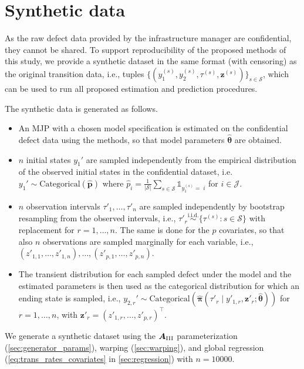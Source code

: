 \begin{table}[h!]  
\centering
\caption{L1-norm of transition residuals $
|| \bm R || $ and normalized predictive entropy $H$ for different model settings.} \label{tab:transition_structure_L1}
\centering
\scriptsize
   
\end{table} 



\newpage

\section{Synthetic data} \label{sec:synthetic_data}
As the raw defect data provided by the infrastructure manager are confidential, they cannot be shared. To support reproducibility of the proposed methods of this study, we provide a synthetic dataset in the same format (with censoring) as the original transition data, i.e., tuples $\{(y_1^{(s)},y_2^{(s)},\tau^{(s)},\bm z^{(s)})\}_{s \in \mathcal S}$, which can be used to run all proposed estimation and prediction procedures.

The synthetic data is generated as follows.
\begin{itemize}
\item An MJP with a chosen model specification is estimated on the confidential defect data using the methods, so that model parameters $\widehat{\bm \theta}$ are obtained.
\item $n$ initial states $y_1'$ are sampled independently from the empirical distribution of the observed initial states in the confidential dataset, i.e.
$
y_1' \sim \text{Categorical}(\widehat{\bm p})$ where $\widehat p_i = \frac{1}{| \mathcal S|} \sum_{s\in\mathcal S} \mathds{1}_{y_1^{(s)}=\;i}
$ for $i \in \mathcal J$. 
\item $n$ observation intervals $\tau'_1,\dots,\tau'_n$ are sampled independently by bootstrap resampling from the observed intervals, i.e.,
$
\tau'_r \overset{\text{i.i.d.}}{\sim} \{\tau^{(s)}: s\in\mathcal S\} $ with replacement for $ r=1,\dots,n$. The same is done for the $p$ covariates, so that also $n$ observations are sampled marginally for each variable, i.e., $(z'_{1,1},\dots,z'_{1,n} ), \dots, (z'_{p,1},\dots,z'_{p,n})$. 
\item The transient distribution for each sampled defect under the model and the estimated parameters is then used as the categorical distribution for which an ending state is sampled, i.e., 
$
y_{2,r}' \sim \text{Categorical}(\widehat{\bm\pi}( \tau'_r \mid y'_{1,r}, \bm z'_r; \widehat{\bm\theta}) )
$ for $r = 1, \dots, n$, with $\bm z'_r = (z'_{1,r},\dots,z'_{p,r})^\top$.
\end{itemize}
We generate a synthetic dataset using the $\bm{A}_{\RN{3}}$ parameterization (\cref{sec:generator_params}), warping (\cref{sec:warping}), and global regression (\cref{eq:trans_rates_covariates} in \cref{sec:regression}) with $n = 10000$.


